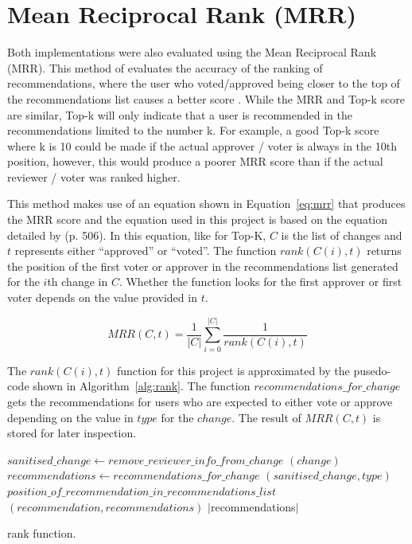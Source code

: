 \section{Mean Reciprocal Rank (MRR)\label{section:evaluation-mrr}}

Both implementations were also evaluated using the Mean Reciprocal Rank (MRR). This method of evaluates the accuracy of the ranking of recommendations, where the user who voted/approved being closer to the top of the recommendations list causes a better score \citep[p. 506]{9240650}. While the MRR and Top-k score are similar, Top-k will only indicate that a user is recommended in the recommendations limited to the number k. For example, a good Top-k score where k is 10 could be made if the actual approver / voter is always in the 10th position, however, this would produce a poorer MRR score than if the actual reviewer / voter was ranked higher.

This method makes use of an equation shown in Equation~\ref{eq:mrr} that produces the MRR score and the equation used in this project is based on the equation detailed by \citeauthor{9240650} \citeyear{9240650} (p. 506). In this equation, like for Top-K, \(C\) is the list of changes and \(t\) represents either ``approved'' or ``voted''. The function \(rank(C(i), t)\) returns the position of the first voter or approver in the recommendations list generated for the \(i\)th change in \(C\). Whether the function looks for the first approver or first voter depends on the value provided in \(t\).

\begin{equation} \label{eq:mrr}
MRR(C, t) = \frac{1}{|C|} \sum_{i=0}^{|C|}\frac{1}{rank(C(i), t)}
\end{equation}

The \(rank(C(i), t)\) function for this project is approximated by the pusedo-code shown in Algorithm~\ref{alg:rank}. The function \(recommendations\_for\_change\) gets the recommendations for users who are expected to either vote or approve depending on the value in \(type\) for the \(change\). The result of \(MRR(C, t)\) is stored for later inspection.

\begin{algorithm}[H]
	 {
            $sanitised\_change \gets remove\_reviewer\_info\_from\_change$ $(change)$\;
            $recommendations \gets recommendations\_for\_change$ $(sanitised\_change, type)$\;
             {
                 {
                    \Return $position\_of\_recommendation\_in\_recommendations\_list$ $(recommendation, recommendations)$\;
                }
            }
            \Return $|$recommendations$|$\;
	}
	\caption
	{\label{alg:rank}rank function.}
\end{algorithm}

